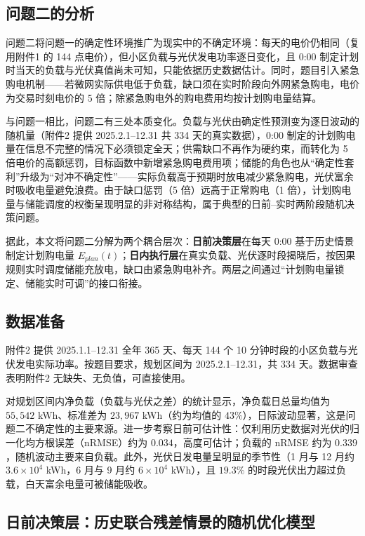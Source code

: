 \documentclass[zihao=-4,a4paper,UTF8,fontset=none]{ctexart}
\begin{document}
\subsection{问题二的分析}

问题二将问题一的确定性环境推广为现实中的不确定环境：每天的电价仍相同（复用附件1 的 144 点电价），但小区负载与光伏发电功率逐日变化，且 0:00 制定计划时当天的负载与光伏真值尚未可知，只能依据历史数据估计。同时，题目引入紧急购电机制——若微网实际供电低于负载，缺口须在实时阶段向外网紧急购电，电价为交易时刻电价的 5 倍；除紧急购电外的购电费用均按计划购电量结算。

与问题一相比，问题二有三处本质变化。负载与光伏由确定性预测变为逐日波动的随机量（附件2 提供 2025.2.1--12.31 共 334 天的真实数据），0:00 制定的计划购电量在信息不完整的情况下必须锁定全天；供需缺口不再作为硬约束，而转化为 5 倍电价的高额惩罚，目标函数中新增紧急购电费用项；储能的角色也从“确定性套利”升级为“对冲不确定性”——实际负载高于预期时放电减少紧急购电，光伏富余时吸收电量避免浪费。由于缺口惩罚（5 倍）远高于正常购电（1 倍），计划购电量与储能调度的权衡呈现明显的非对称结构，属于典型的日前--实时两阶段随机决策问题\cite{birge1997stochastic,hou2023multi}。

据此，本文将问题二分解为两个耦合层次：\textbf{日前决策层}在每天 0:00 基于历史情景制定计划购电量 $E_{plan}(t)$；\textbf{日内执行层}在真实负载、光伏逐时段揭晓后，按因果规则实时调度储能充放电，缺口由紧急购电补齐。两层之间通过“计划购电量锁定、储能实时可调”的接口衔接。

\subsection{数据准备}

附件2 提供 2025.1.1--12.31 全年 365 天、每天 144 个 10 分钟时段的小区负载与光伏发电实际功率。按题目要求，规划区间为 2025.2.1--12.31，共 334 天。数据审查表明附件2 无缺失、无负值，可直接使用。

对规划区间内净负载（负载与光伏之差）的统计显示，净负载日总量均值为 $55{,}542$ kWh、标准差为 $23{,}967$ kWh（约为均值的 $43\%$），日际波动显著，这是问题二不确定性的主要来源。进一步考察日前可估计性：仅利用历史数据对光伏的归一化均方根误差（nRMSE）约为 $0.034$，高度可估计；负载的 nRMSE 约为 $0.339$，随机波动主要来自负载。此外，光伏日发电量呈明显的季节性（1 月与 12 月约 $3.6\times10^4$ kWh，6 月与 9 月约 $6\times10^4$ kWh），且 $19.3\%$ 的时段光伏出力超过负载，白天富余电量可被储能吸收。

\subsection{日前决策层：历史联合残差情景的随机优化模型}
\end{document}
